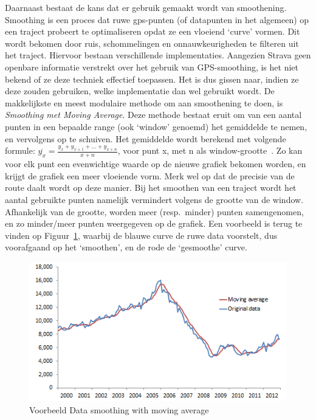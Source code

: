 Daarnaast bestaat de kans dat er gebruik gemaakt wordt van smoothening.
Smoothing is een proces dat ruwe \ac{gps}-punten (of datapunten in het
algemeen) op een traject probeert te optimaliseren opdat ze een vloeiend
`curve' vormen. Dit wordt bekomen door ruis, schommelingen en onnauwkeurigheden
te filteren uit het traject. Hiervoor bestaan verschillende implementaties.
Aangezien Strava geen openbare informatie verstrekt over het gebruik van
GPS-smoothing, is het niet bekend of ze deze techniek effectief toepassen. Het
is dus gissen naar, indien ze deze zouden gebruiken, welke implementatie dan
wel gebruikt wordt. De makkelijkste en meest modulaire methode om aan
smoothening te doen, is \textit{Smoothing met Moving Average}. Deze methode
bestaat eruit om van een aantal punten in een bepaalde range (ook `window'
genoemd) het gemiddelde te nemen, en vervolgens op te schuiven. Het gemiddelde
wordt berekend met volgende formule: $\overline{y_x} = \frac{y_x + y_{x+1} +
        \ldots + y_{x+n}}{x+n}$, voor punt x, met n als
window-grootte~\cite{Smoothin16:online,
    SmoothingandInterpolatingNoisyGPSDatawithSmoothingSplines, Smoothin86:online}.
Zo kan voor elk punt een evenwichtige waarde op de nieuwe grafiek bekomen
worden, en krijgt de grafiek een meer vloeiende vorm. Merk wel op dat de
precisie van de route daalt wordt op deze manier. Bij het smoothen van een
traject wordt het aantal gebruikte punten namelijk vermindert volgens de
grootte van de window. Afhankelijk van de grootte, worden meer (resp.\ minder)
punten samengenomen, en zo minder/meer punten weergegeven op de grafiek. Een
voorbeeld is terug te vinden op Figuur~\ref{fig:SmoothingExample}, waarbij de
blauwe curve de ruwe data voorstelt, dus voorafgaand op het `smoothen', en de
rode de `gesmoothe' curve.
\begin{figure}[h]
    \centering
    \includegraphics[width=0.6\linewidth]{fig/SmoothingExample.png}
    \caption{Voorbeeld Data smoothing with moving average}\label{fig:SmoothingExample}
\end{figure}

